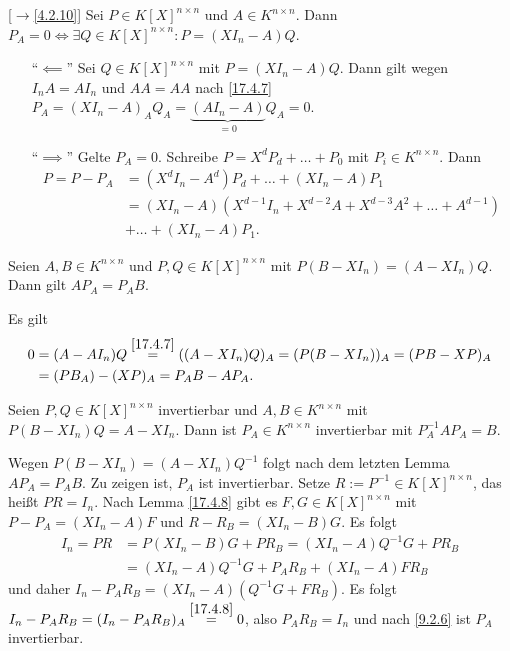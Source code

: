 \documentclass[../../main.tex]{subfiles}
\begin{document}
\begin{lem}\mbox{}[$\to$\ref{4.2.10}]\label{17.4.8}
    Sei $P\in K[X]^{n\times n}$ und $A\in K^{n\times n}$. Dann $P_A=0\Longleftrightarrow \exists Q\in K[X]^{n\times n}: P=(XI_n-A)Q$.
\end{lem}
\begin{cproof}
    \begin{itemize}
        \item[\enquote{$\impliedby$}] Sei $Q\in K[X]^{n\times n}$ mit $P=(XI_n-A)Q$. Dann gilt wegen $I_nA=AI_n$  und $AA=AA$ nach \ref{17.4.7} $P_A=(XI_n-A)_AQ_A=\underbrace{(AI_n-A)}_{=0}Q_A=0$.
        \item[\enquote{$\implies$}] Gelte $P_A=0$. Schreibe $P=X^dP_d+\ldots +P_0$ mit $P_i\in K^{n\times n}$. Dann
        \begin{align*}
            P=P-P_A&=(X^dI_n-A^d)P_d+\ldots +(XI_n-A)P_1\\
            &=(XI_n-A)(X^{d-1}I_n+X^{d-2}A+X^{d-3}A^2+\ldots +A^{d-1})\\
            &+\ldots +(XI_n-A)P_1.
        \end{align*}
    \end{itemize}
\end{cproof}

\begin{lem}\label{17.4.9}
    Seien $A,B\in K^{n\times n}$ und $P,Q\in K[X]^{n\times n}$ mit $P(B-XI_n)=(A-XI_n)Q$. Dann gilt $AP_A=P_AB$.
\end{lem}
\begin{cproof}
    Es gilt
    \begin{align*}
        0&=(A-AI_n)Q\stackrel{\ref{17.4.7}}{=}((A-XI_n)Q)_A=(P(B-XI_n))_A=(PB-XP)_A\\
        &=(PB_A)-(XP)_A=P_AB-AP_A.
    \end{align*}
\end{cproof}

\begin{sat}\label{17.4.10}
    Seien $P,Q\in K[X]^{n\times n}$ invertierbar und $A,B\in K^{n\times n}$ mit $P(B-XI_n)Q=A-XI_n$. Dann ist $P_A\in K^{n\times n}$ invertierbar mit $P_A^{-1}AP_A=B$.
\end{sat}
\begin{cproof}
    Wegen $P(B-XI_n)=(A-XI_n)Q^{-1}$ folgt nach dem letzten Lemma $AP_A=P_AB$. Zu zeigen ist, $P_A$ ist invertierbar. Setze $R:=P^{-1}\in K[X]^{n\times n}$, das heißt $PR=I_n$. Nach Lemma \ref{17.4.8} gibt es $F,G\in K[X]^{n\times n}$ mit $P-P_A=(XI_n-A)F$ und $R-R_B=(XI_n-B)G$. Es folgt
    \begin{align*}
        I_n=PR&=P(XI_n-B)G+PR_B=(XI_n-A)Q^{-1}G+PR_B\\
        &=(XI_n-A)Q^{-1}G+P_AR_B+(XI_n-A)FR_B
    \end{align*}
    und daher $I_n-P_AR_B=(XI_n-A)(Q^{-1}G+FR_B)$. Es folgt $I_n-P_AR_B=(I_n-P_AR_B)_A\stackrel{\ref{17.4.8}}{=}0$, also $P_AR_B=I_n$ und nach \ref{9.2.6} ist $P_A$ invertierbar.
\end{cproof}
\end{document}
